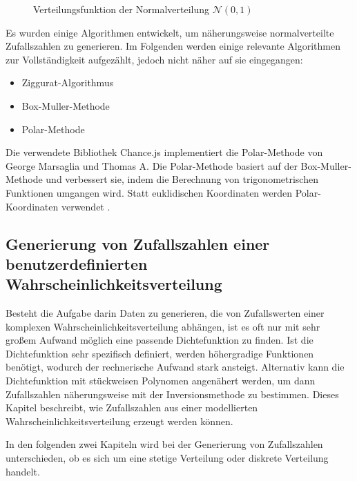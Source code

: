 \begin{figure}[H]
    \centering
    \caption{Verteilungsfunktion der Normalverteilung $\mathcal{N}(0,1)$}
    \label{fig:normalverteilung}
\end{figure}

Es wurden einige Algorithmen entwickelt, um näherungsweise normalverteilte Zufallszahlen zu generieren. Im Folgenden werden einige relevante Algorithmen zur Vollständigkeit aufgezählt, jedoch nicht näher auf sie eingegangen:
\begin{itemize}
    \item Ziggurat-Algorithmus
    \item Box-Muller-Methode
    \item Polar-Methode
\end{itemize}

Die verwendete Bibliothek Chance.js implementiert die Polar-Methode von George Marsaglia und Thomas A. Die Polar-Methode basiert auf der Box-Muller-Methode und verbessert sie, indem die Berechnung von trigonometrischen Funktionen umgangen wird. Statt euklidischen Koordinaten werden Polar-Koordinaten verwendet \cite{polarmethode}.

\subsection{Generierung von Zufallszahlen einer benutzerdefinierten Wahrscheinlichkeitsverteilung}
\label{sec:anpassbareverteilungberechnung}

Besteht die Aufgabe darin Daten zu generieren, die von Zufallswerten einer komplexen Wahrscheinlichkeitsverteilung abhängen, ist es oft nur mit sehr großem Aufwand möglich eine passende Dichtefunktion zu finden. Ist die Dichtefunktion sehr spezifisch definiert, werden höhergradige Funktionen benötigt, wodurch der rechnerische Aufwand stark ansteigt. Alternativ kann die Dichtefunktion mit stückweisen Polynomen angenähert werden, um dann Zufallszahlen näherungsweise mit der Inversionsmethode zu bestimmen. Dieses Kapitel beschreibt, wie Zufallszahlen aus einer modellierten Wahrscheinlichkeitsverteilung erzeugt werden können.

In den folgenden zwei Kapiteln wird bei der Generierung von Zufallszahlen unterschieden, ob es sich um eine stetige Verteilung oder diskrete Verteilung handelt.

